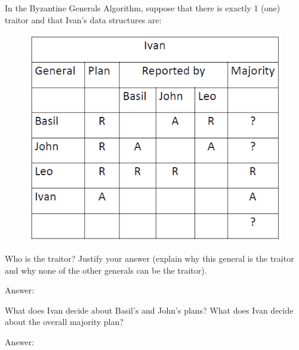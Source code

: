 \documentclass{article}
\begin{document}
\setcounter{question}{0}

\begin{Question} 
    In the Byzantine Generals Algorithm, suppose that there is exactly 1 (one) traitor and that Ivan's data structures are:
    \begin{figure}[H]
        \centering 
        \includegraphics[width=s\textwidth]{DV_demand1}
    \end{figure}

\begin{Subquestion}
    Who is the traitor? Justify your answer (explain why this general is the traitor and why none of the other generals can be the traitor).
    
\begin{answer}
    Answer:
    \begin{quote}
        
    \end{quote}
\end{answer}
\end{Subquestion}


\begin{Subquestion}
    What does Ivan decide about Basil's and John's plans? What does Ivan decide about the overall majority plan?
    
\begin{answer}
    Answer:
    \begin{quote}
        
    \end{quote}
\end{answer}
\end{Subquestion}


\end{Question}
\end{document}

